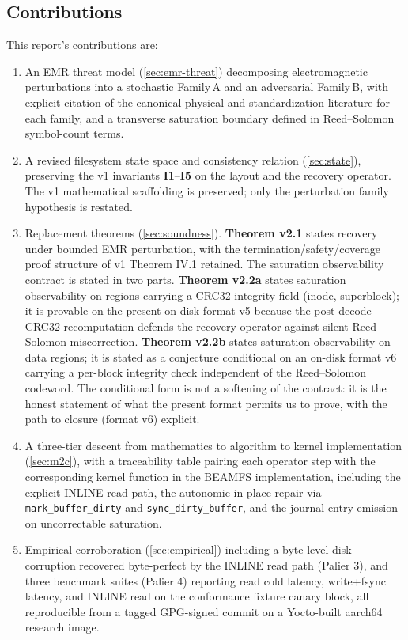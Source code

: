 \subsection{Contributions}

This report's contributions are:

\begin{enumerate}
\item An EMR threat model
  (\cref{sec:emr-threat}) decomposing electromagnetic perturbations
  into a stochastic Family\,A and an adversarial Family\,B, with
  explicit citation of the canonical physical and standardization
  literature for each family, and a transverse saturation boundary
  defined in Reed--Solomon symbol-count terms.
\item A revised filesystem state space and consistency relation
  (\cref{sec:state}), preserving the v1 invariants
  \textbf{I1}--\textbf{I5} on the layout and the recovery
  operator. The v1 mathematical scaffolding is preserved; only the
  perturbation family hypothesis is restated.
\item Replacement theorems
  (\cref{sec:soundness}). \textbf{Theorem v2.1} states recovery
  under bounded EMR perturbation, with the
  termination/safety/coverage proof structure of v1 Theorem IV.1
  retained. The saturation observability contract is stated in two
  parts. \textbf{Theorem v2.2a} states saturation observability on
  regions carrying a CRC32 integrity field (inode, superblock);
  it is provable on the present on-disk format v5 because the
  post-decode CRC32 recomputation defends the recovery operator
  against silent Reed--Solomon miscorrection. \textbf{Theorem v2.2b}
  states saturation observability on data regions; it is stated as
  a conjecture conditional on an on-disk format v6 carrying a
  per-block integrity check independent of the Reed--Solomon
  codeword. The conditional form is not a softening of the contract:
  it is the honest statement of what the present format permits us
  to prove, with the path to closure (format v6) explicit.
\item A three-tier descent from mathematics to algorithm to kernel
  implementation (\cref{sec:m2c}), with a traceability table
  pairing each operator step with the corresponding kernel
  function in the BEAMFS implementation, including the explicit
  INLINE read path, the autonomic in-place repair via
  \texttt{mark\_buffer\_dirty} and \texttt{sync\_dirty\_buffer},
  and the journal entry emission on uncorrectable saturation.
\item Empirical corroboration (\cref{sec:empirical}) including a
  byte-level disk corruption recovered byte-perfect by the INLINE
  read path (Palier 3), and three benchmark suites (Palier 4)
  reporting read cold latency, write+fsync latency, and INLINE
  read on the conformance fixture canary block, all reproducible
  from a tagged GPG-signed commit on a Yocto-built aarch64
  research image.
\end{enumerate}

